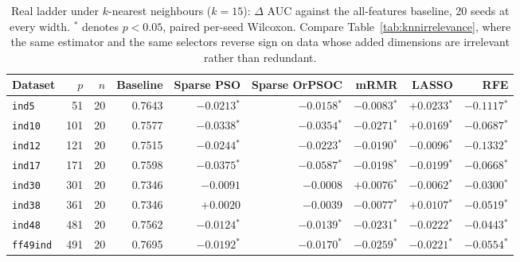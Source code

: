 \begin{table}[htbp]
    \centering
    \small\setlength{\tabcolsep}{4pt}
    \begin{tabular}{lrrrrrrrr}
    \hline
    Dataset & $p$ & $n$ & Baseline & Sparse PSO & Sparse OrPSOC & mRMR & LASSO & RFE \\
    \hline
    \texttt{ind5} & 51 & 20 & 0.7643 & $-0.0213$$^{*}$ & $-0.0158$$^{*}$ & $-0.0083$$^{*}$ & $+0.0233$$^{*}$ & $-0.1117$$^{*}$ \\
    \texttt{ind10} & 101 & 20 & 0.7577 & $-0.0338$$^{*}$ & $-0.0354$$^{*}$ & $-0.0271$$^{*}$ & $+0.0169$$^{*}$ & $-0.0687$$^{*}$ \\
    \texttt{ind12} & 121 & 20 & 0.7515 & $-0.0244$$^{*}$ & $-0.0223$$^{*}$ & $-0.0190$$^{*}$ & $-0.0096$$^{*}$ & $-0.1332$$^{*}$ \\
    \texttt{ind17} & 171 & 20 & 0.7598 & $-0.0375$$^{*}$ & $-0.0587$$^{*}$ & $-0.0198$$^{*}$ & $-0.0199$$^{*}$ & $-0.0668$$^{*}$ \\
    \texttt{ind30} & 301 & 20 & 0.7346 & $-0.0091$ & $-0.0008$ & $+0.0076$$^{*}$ & $-0.0062$$^{*}$ & $-0.0300$$^{*}$ \\
    \texttt{ind38} & 361 & 20 & 0.7346 & $+0.0020$ & $-0.0039$ & $-0.0077$$^{*}$ & $+0.0107$$^{*}$ & $-0.0519$$^{*}$ \\
    \texttt{ind48} & 481 & 20 & 0.7562 & $-0.0124$$^{*}$ & $-0.0139$$^{*}$ & $-0.0231$$^{*}$ & $-0.0222$$^{*}$ & $-0.0443$$^{*}$ \\
    \texttt{ff49ind} & 491 & 20 & 0.7695 & $-0.0192$$^{*}$ & $-0.0170$$^{*}$ & $-0.0259$$^{*}$ & $-0.0221$$^{*}$ & $-0.0554$$^{*}$ \\
    \hline
    \end{tabular}
    \caption{Real ladder under $k$-nearest neighbours ($k = 15$): $\Delta$ AUC against the all-features baseline, 20 seeds at every width. $^{*}$ denotes $p < 0.05$, paired per-seed Wilcoxon. Compare Table~\ref{tab:knnirrelevance}, where the same estimator and the same selectors reverse sign on data whose added dimensions are irrelevant rather than redundant.}
    \label{tab:knn}
\end{table}
